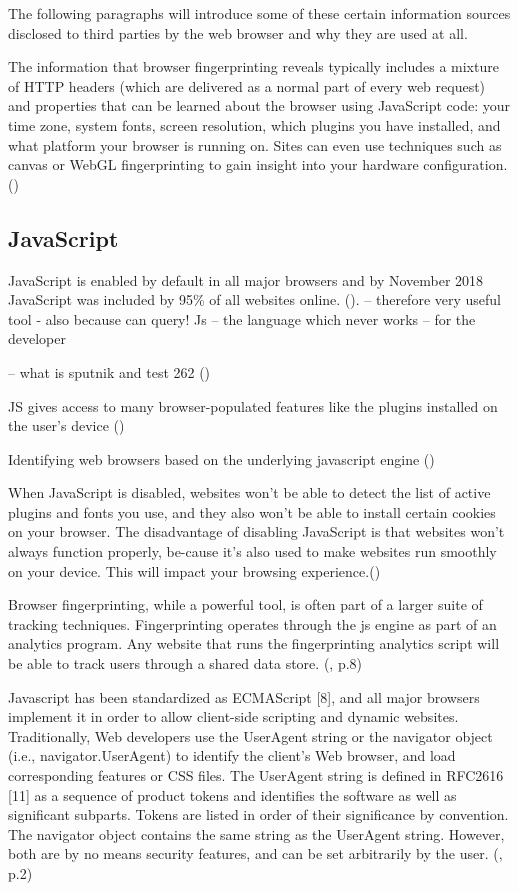 The following paragraphs will introduce some of these certain information sources disclosed to third parties by the web browser and why they are used at all.


The information that browser fingerprinting reveals typically includes a mixture of HTTP headers (which are delivered as a normal part of every web request) and properties that can be learned about the browser using JavaScript code: your time zone, system fonts, screen resolution, which plugins you have installed, and what platform your browser is running on. Sites can even use techniques such as canvas or WebGL fingerprinting to gain insight into your hardware configuration.(\textcite{miele18})

\subsection{JavaScript}\label{JS}

JavaScript is enabled by default in all major browsers and by November 2018 JavaScript was included by 95\% of all websites online. (\textcite{w3techs18}).
-- therefore very useful tool - also because can query!
Js – the language which never works – for the developer

-- what is sputnik and test 262 ()

JS gives access to many browser-populated features like the plugins installed on the user’s device (\textcite{amiunique})

Identifying web browsers based on the underlying javascript engine
(\textcite{mulazzani13})

When JavaScript is disabled, websites won’t be able to detect the list of active plugins and fonts you use, and they also won’t be able to install certain cookies on your browser.
The disadvantage of disabling JavaScript is that websites won’t always function properly, be-cause it’s also used to make websites run smoothly on your device. This will impact your browsing experience.(\textcite{pixel18})

Browser fingerprinting, while a powerful tool, is often part of a larger suite of tracking techniques. Fingerprinting operates through the js engine as part of an analytics program. Any website that runs the fingerprinting analytics script will be able to track users through a shared data store.
(\textcite{havens16}, p.8)


Javascript has been standardized as ECMAScript [8],
and all major browsers implement it in order to allow
client-side scripting and dynamic websites. Traditionally,
Web developers use the UserAgent string or the navigator
object (i.e., navigator.UserAgent) to identify the client’s
Web browser, and load corresponding features or CSS files.
The UserAgent string is defined in RFC2616 [11] as a
sequence of product tokens and identifies the software as
well as significant subparts. Tokens are listed in order of their
significance by convention. The navigator object contains the
same string as the UserAgent string. However, both are by
no means security features, and can be set arbitrarily by the
user.
(\textcite{mulazzani13}, p.2)\\

